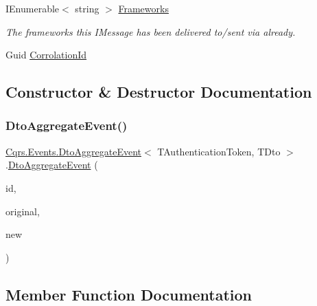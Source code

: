 \begin{DoxyCompactItemize}
I\+Enumerable$<$ string $>$ \hyperlink{classCqrs_1_1Events_1_1DtoAggregateEvent_a58aae5cf252106008695c50ffe994517}{Frameworks}
\begin{DoxyCompactList}\small\item\em The frameworks this I\+Message has been delivered to/sent via already. \end{DoxyCompactList}\item 
Guid \hyperlink{classCqrs_1_1Events_1_1DtoAggregateEvent_acc19ce6f3b8d2070ce31f92a4ad02df2}{Corrolation\+Id}
\end{DoxyCompactItemize}


\subsection{Constructor \& Destructor Documentation}
\mbox{\label{classCqrs_1_1Events_1_1DtoAggregateEvent_a9741e3dae73892ee98408547ea953d4d}} 
\subsubsection{\texorpdfstring{Dto\+Aggregate\+Event()}{DtoAggregateEvent()}}
{\footnotesize\ttfamily \hyperlink{classCqrs_1_1Events_1_1DtoAggregateEvent}{Cqrs.\+Events.\+Dto\+Aggregate\+Event}$<$ T\+Authentication\+Token, T\+Dto $>$.\hyperlink{classCqrs_1_1Events_1_1DtoAggregateEvent}{Dto\+Aggregate\+Event} (\begin{DoxyParamCaption}\item[{Guid}]{id,  }\item[{T\+Dto}]{original,  }\item[{T\+Dto @}]{new }\end{DoxyParamCaption})}



\subsection{Member Function Documentation}
\mbox{\label{classCqrs_1_1Events_1_1DtoAggregateEvent_af5bed152d656cb758312f499f87e69de}} 
